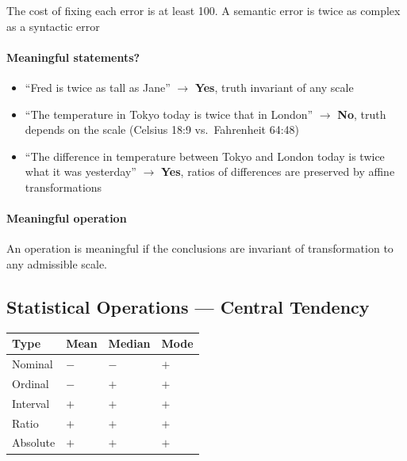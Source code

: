 The cost of fixing each error is at least 100.
A semantic error is twice as complex as a syntactic error

\paragraph{Meaningful statements?}
\begin{itemize}
  \item ``Fred is twice as tall as Jane'' $\to$ \textbf{Yes}, truth invariant of any scale
  \item ``The temperature in Tokyo today is twice that in London'' $\to$ \textbf{No},
        truth depends on the scale (Celsius 18:9 vs.\ Fahrenheit 64:48)
  \item ``The difference in temperature between Tokyo and London today is twice what it was
        yesterday'' $\to$ \textbf{Yes}, ratios of differences are preserved by affine
        transformations
\end{itemize}

\paragraph{Meaningful operation}
An operation is meaningful if the conclusions are invariant of transformation to any
admissible scale.

\subsection{Statistical Operations — Central Tendency}

\begin{table}[h!]
  \renewcommand{\arraystretch}{1.4}
  \centering
  \begin{tabularx}{0.6\textwidth}{>{\raggedright\arraybackslash}X >{\centering\arraybackslash}X >{\centering\arraybackslash}X >{\centering\arraybackslash}X}
    \toprule
    \textbf{Type} & \textbf{Mean} & \textbf{Median} & \textbf{Mode} \\
    \midrule
    Nominal       & $-$           & $-$             & $+$           \\
    Ordinal       & $-$           & $+$             & $+$           \\
    Interval      & $+$           & $+$             & $+$           \\
    Ratio         & $+$           & $+$             & $+$           \\
    Absolute      & $+$           & $+$             & $+$           \\
    \bottomrule
  \end{tabularx}
\end{table}

